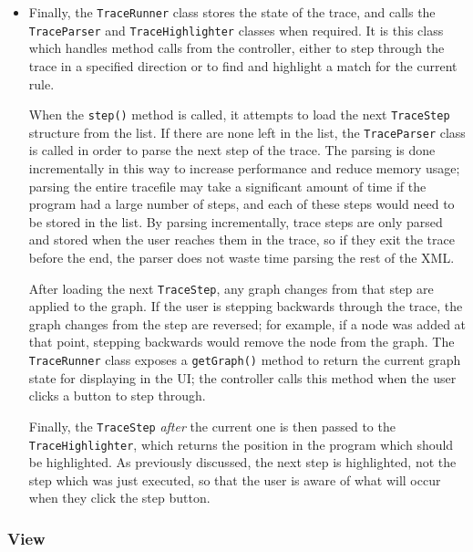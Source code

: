 \documentclass[authoryearcitations]{UoYCSproject}
\begin{document}
\begin{itemize}
    \item Finally, the \texttt{TraceRunner} class stores the state of the trace, and
          calls the \texttt{TraceParser} and \texttt{TraceHighlighter} classes when
          required. It is this class which handles method calls from the controller,
          either to step through the trace in a specified direction or to find and
          highlight a match for the current rule.

          When the \texttt{step()} method is called, it attempts to load the next
          \texttt{TraceStep} structure from the list. If there are none left in the
          list, the \texttt{TraceParser} class is called in order to parse the next
          step of the trace. The parsing is done incrementally in this way to increase
          performance and reduce memory usage; parsing the entire tracefile may take
          a significant amount of time if the program had a large number of steps, and
          each of these steps would need to be stored in the list. By parsing
          incrementally, trace steps are only parsed and stored when the user reaches
          them in the trace, so if they exit the trace before the end, the parser does
          not waste time parsing the rest of the XML.

          After loading the next \texttt{TraceStep}, any graph changes from that step
          are applied to the graph. If the user is stepping backwards through the trace,
          the graph changes from the step are reversed; for example, if a node was
          added at that point, stepping backwards would remove the node from the graph.
          The \texttt{TraceRunner} class exposes a \texttt{getGraph()} method to return
          the current graph state for displaying in the UI; the controller calls this
          method when the user clicks a button to step through.

          Finally, the \texttt{TraceStep} \emph{after} the current one is then passed
          to the \texttt{TraceHighlighter}, which returns the position in the program
          which should be highlighted. As previously discussed, the next step is
          highlighted, not the step which was just executed, so that the user is aware
          of what will occur when they click the step button.

\end{itemize}

\subsubsection{View}
\label{sec:MVCView}
\end{document}
